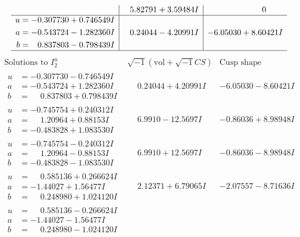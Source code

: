 \documentclass[1p]{elsarticle_modified}
\theoremstyle{definition}
\newcommand{\I}{\sqrt{-1}}
\begin{document}
$$\begin{array}{c|c|c}
 & \phantom{-}5.82791 + 3.59484 I & \phantom{-0.000000 } 0 \\ \hline\begin{aligned}
u &= -0.307730 + 0.746549 I \\
a &= -0.543724 - 1.282360 I \\
b &= \phantom{-}0.837803 - 0.798439 I\end{aligned}
 & \phantom{-}0.24044 - 4.20991 I & -6.05030 + 8.60421 I\\
 \hline 
 \end{array}$$\newpage$$\begin{array}{c|c|c}  
\text{Solutions to }I^u_{2}& \I (\text{vol} + \sqrt{-1}CS) & \text{Cusp shape}\\
 \hline 
\begin{aligned}
u &= -0.307730 - 0.746549 I \\
a &= -0.543724 + 1.282360 I \\
b &= \phantom{-}0.837803 + 0.798439 I\end{aligned}
 & \phantom{-}0.24044 + 4.20991 I & -6.05030 - 8.60421 I \\ \hline\begin{aligned}
u &= -0.745754 + 0.240312 I \\
a &= \phantom{-}1.20964 + 0.88153 I \\
b &= -0.483828 + 1.083530 I\end{aligned}
 & \phantom{-}6.9910 - 12.5697 I & -0.86036 + 8.98948 I \\ \hline\begin{aligned}
u &= -0.745754 - 0.240312 I \\
a &= \phantom{-}1.20964 - 0.88153 I \\
b &= -0.483828 - 1.083530 I\end{aligned}
 & \phantom{-}6.9910 + 12.5697 I & -0.86036 - 8.98948 I \\ \hline\begin{aligned}
u &= \phantom{-}0.585136 + 0.266624 I \\
a &= -1.44027 + 1.56477 I \\
b &= \phantom{-}0.248980 + 1.024120 I\end{aligned}
 & \phantom{-}2.12371 + 6.79065 I & -2.07557 - 8.71636 I \\ \hline\begin{aligned}
u &= \phantom{-}0.585136 - 0.266624 I \\
a &= -1.44027 - 1.56477 I \\
b &= \phantom{-}0.248980 - 1.024120 I\end{aligned}

\end{array}$$
\end{document}
